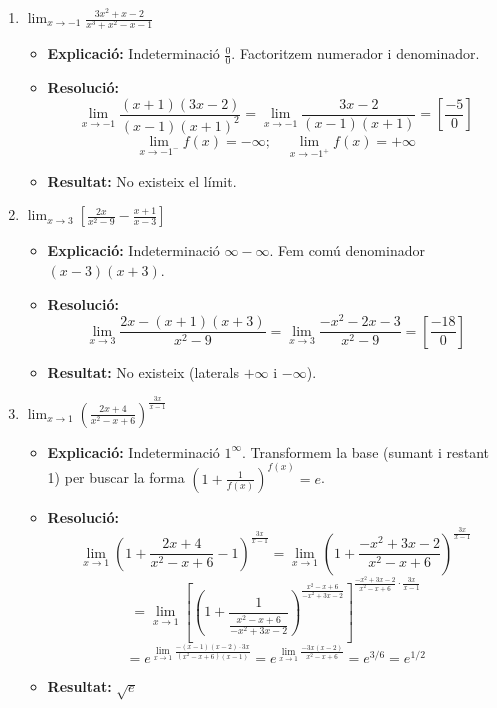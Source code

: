 \documentclass[12pt,a4paper]{article}
\begin{document}
\begin{enumerate}[label=\textbf{7.\arabic*.}]
    \item $\lim_{x \to -1} \frac{3x^2+x-2}{x^3+x^2-x-1}$
        \begin{itemize}
            \item \textbf{Explicació:} Indeterminació $\frac{0}{0}$. Factoritzem numerador i denominador.
            \item \textbf{Resolució:}
            $$ \lim_{x \to -1} \frac{(x+1)(3x-2)}{(x-1)(x+1)^2} = \lim_{x \to -1} \frac{3x-2}{(x-1)(x+1)} = \left[ \frac{-5}{0} \right] $$
            $$ \lim_{x \to -1^-} f(x) = -\infty; \quad \lim_{x \to -1^+} f(x) = +\infty $$
            \item \textbf{Resultat:} No existeix el límit.
        \end{itemize}

    \item $\lim_{x \to 3} \left[ \frac{2x}{x^2-9} - \frac{x+1}{x-3} \right]$
        \begin{itemize}
            \item \textbf{Explicació:} Indeterminació $\infty - \infty$. Fem comú denominador $(x-3)(x+3)$.
            \item \textbf{Resolució:}
            $$ \lim_{x \to 3} \frac{2x - (x+1)(x+3)}{x^2-9} = \lim_{x \to 3} \frac{-x^2-2x-3}{x^2-9} = \left[ \frac{-18}{0} \right] $$
            \item \textbf{Resultat:} No existeix (laterals $+\infty$ i $-\infty$).
        \end{itemize}

    \item $\lim_{x \to 1} \left( \frac{2x+4}{x^2-x+6} \right)^{\frac{3x}{x-1}}$
        \begin{itemize}
            \item \textbf{Explicació:} Indeterminació $1^\infty$. Transformem la base (sumant i restant 1) per buscar la forma $\left(1+\frac{1}{f(x)}\right)^{f(x)}=e$.
            \item \textbf{Resolució:}
            $$ \lim_{x \to 1} \left( 1 + \frac{2x+4}{x^2-x+6} - 1 \right)^{\frac{3x}{x-1}} = \lim_{x \to 1} \left( 1 + \frac{-x^2+3x-2}{x^2-x+6} \right)^{\frac{3x}{x-1}} $$
            $$ = \lim_{x \to 1} \left[ \left( 1 + \frac{1}{\frac{x^2-x+6}{-x^2+3x-2}} \right)^{\frac{x^2-x+6}{-x^2+3x-2}} \right]^{\frac{-x^2+3x-2}{x^2-x+6} \cdot \frac{3x}{x-1}} $$
            $$ = e^{\lim_{x \to 1} \frac{-(x-1)(x-2) \cdot 3x}{(x^2-x+6)(x-1)}} = e^{\lim_{x \to 1} \frac{-3x(x-2)}{x^2-x+6}} = e^{3/6} = e^{1/2} $$
            \item \textbf{Resultat:} $\sqrt{e}$
        \end{itemize}


\end{enumerate}
\end{document}
